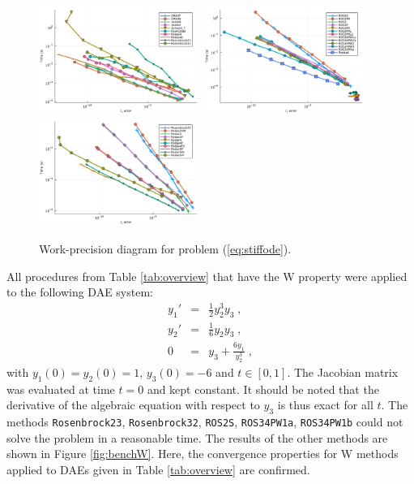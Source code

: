 \documentclass{juliacon}
\begin{document}
\begin{figure}
 \centering
 \includegraphics[width=0.47\textwidth]{Abb3a.pdf}
 \includegraphics[width=0.47\textwidth]{Abb3b.pdf}
 \includegraphics[width=0.47\textwidth]{Abb3c.pdf}
 \caption{Work-precision diagram for problem (\ref{eq:stiffode}).}\label{fig:bench3a}
\end{figure}

All procedures from Table \ref{tab:overview} that have the W property were applied to the following DAE system:
\begin{eqnarray}
y_1' &=& \frac{1}{2}y_2^3 y_3 \; , \label{eq:w1} \\
y_2' &=& \frac{1}{6} y_2 y_3 \; , \label{eq:w2}\\
0 &=& y_3 + \frac{6 y_1}{y_2^3} \; ,\label{eq:w3}
\end{eqnarray}
with $y_1(0) = y_2(0) =1$, $y_3(0)=-6$ and $t \in [0,1]$.
The Jacobian matrix was evaluated at time $t=0$ and kept constant. It should be noted that the derivative of the algebraic equation with respect to 
$y_3$ is thus exact for all $t$.
The methods \verb|Rosenbrock23|, \verb|Rosenbrock32|, \verb|ROS2S|, \verb|ROS34PW1a|, \verb|ROS34PW1b| could not solve the problem in a reasonable time. 
The results of the other methods are shown in Figure \ref{fig:benchW}. Here, the convergence properties for W methods applied to DAEs given in 
Table \ref{tab:overview} are confirmed.
\end{document}
